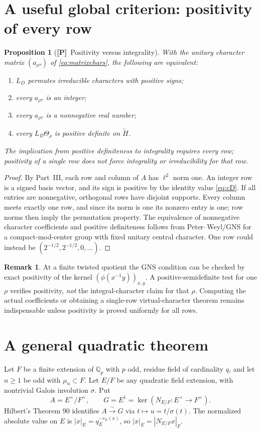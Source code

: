 \documentclass[11pt]{article}
\newcommand{\tH}{\widetilde H}
\newcommand{\Ptag}{\textnormal{\textbf{[P]}}}
\theoremstyle{plain}
\newtheorem{proposition}[theorem]{Proposition}
\theoremstyle{definition}
\newtheorem{remark}[theorem]{Remark}
\begin{document}
\section{A useful global criterion: positivity of every row}\label{sec:positive}
\begin{proposition}[\Ptag\ Positivity versus integrality]\label{prop:positive}
With the unitary character matrix $(a_{\rho\tau})$ of
\eqref{eq:matrixchars}, the following are equivalent:
\begin{enumerate}[label=(\alph*)]
\item $L_D$ permutes irreducible characters with positive signs;
\item every $a_{\rho\tau}$ is an integer;
\item every $a_{\rho\tau}$ is a nonnegative real number;
\item every $L_D\Theta_\rho$ is positive definite on $\tH$.
\end{enumerate}
The implication from positive definiteness to integrality
requires \emph{every} row; positivity of a single row does not
force integrality or irreducibility for that row.
\end{proposition}
\begin{proof}
By Part~III, each row and column of $A$ has $\ell^2$ norm one.
An integer row is a signed basis vector, and its sign is positive
by the identity value \eqref{eq:cD}.  If all entries are
nonnegative, orthogonal rows have disjoint supports.  Every
column meets exactly one row, and since its norm is one its
nonzero entry is one; row norms then imply the permutation
property.  The equivalence of nonnegative character coefficients
and positive definiteness follows from Peter--Weyl/GNS for a
compact-mod-center group with fixed unitary central character.
One row could instead be $(2^{-1/2},2^{-1/2},0,\ldots)$.
\end{proof}
\begin{remark}
At a finite twisted quotient the GNS condition can be checked
by exact positivity of the kernel $(\phi(x^{-1}y))_{x,y}$.
A positive-semidefinite test for one $\rho$ verifies positivity,
\emph{not} the integral-character claim for that $\rho$.
Computing the actual coefficients or obtaining a single-row
virtual-character theorem remains indispensable unless
positivity is proved uniformly for all rows.
\end{remark}

\section{A general quadratic theorem}\label{sec:general-toral}
Let $F$ be a finite extension of $\mathbb Q_p$ with $p$ odd, residue field of cardinality $q$, and let $n\geq1$ be odd with $\mu_n\subset F$. Let $E/F$ be any quadratic field extension, with nontrivial Galois involution $\sigma$. Put
\[
 A=E^\times/F^\times,\qquad G=E^1=\ker(N_{E/F}:E^\times\to F^\times).
\]
Hilbert's Theorem 90 identifies $A\xrightarrow{\sim}G$ via $t\mapsto u=t/\sigma(t)$. The normalized absolute value on $E$ is $|x|_E=q_E^{-v_E(x)}$, so $|x|_E=|N_{E/F}x|_F$.
\end{document}
